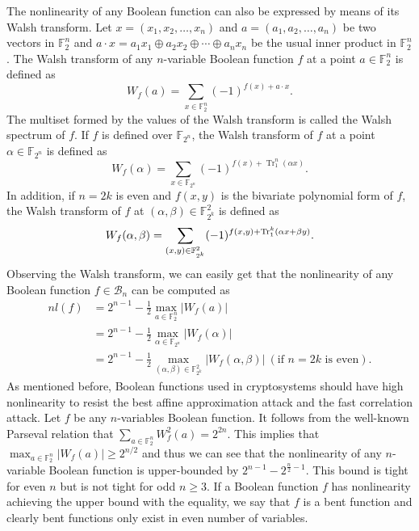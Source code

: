 \documentclass{article}
\newcommand{\F}{\mathbb{F}}
\newcommand{\0}{\textbf{0}}
\newcommand{\1}{\textbf{1}}
\newcommand{\TrN}{\operatorname{Tr}_1^n}
\theoremstyle{plain}
\begin{document}
    The nonlinearity of any Boolean function can also be expressed by means of its Walsh transform.
    Let $x=(x_1,x_2,\dots,x_n)$ and $a=(a_1,a_2,\dots,a_n)$ be two vectors in $\F_2^n$ and $a\cdot x=a_1x_1\oplus a_2x_2\oplus\cdots\oplus a_nx_n$ be the usual inner product in $\F_2^n$.
    The Walsh transform of any $n$-variable Boolean function $f$ at a point $a\in\F_2^n$ is defined as
    \[W_f(a)=\sum_{x\in\F_2^n}(-1)^{f(x)+a\cdot x}.\]
    The multiset formed by the values of the Walsh transform is called the Walsh spectrum of $f$.
    If $f$ is defined over $\F_{2^n}$, the Walsh transform of $f$ at a point $\alpha\in\F_{2^n}$ is defined as
    \[W_f(\alpha)=\sum_{x\in\F_{2^n}}(-1)^{f(x)+\TrN(\alpha x)}.\]
    In addition, if $n=2k$ is even and $f(x,y)$ is the bivariate polynomial form of $f$, the Walsh transform of $f$ at $(\alpha,\beta)\in\F_{2^k}^2$ is defined as
    \[W_f(\alpha,\beta)=\sum_{(x,y)\in\F_{2^k}^2}(-1)^{f(x,y)+\Tr_1^k(\alpha x+\beta y)}.\]
    Observing the Walsh transform, we can easily get that the nonlinearity of any Boolean function $f\in\mathcal{B}_n$ can be computed as
    \begin{align*}
        nl(f) &= 2^{n-1} - \frac{1}{2}\max_{a\in\F_2^n}|W_f(a)|\\
              &= 2^{n-1} - \frac{1}{2}\max_{\alpha\in\F_{2^n}}|W_f(\alpha)|\\
              &= 2^{n-1} - \frac{1}{2}\max_{(\alpha,\beta)\in\F_{2^k}^2}|W_f(\alpha,\beta)|~(\text{if }n=2k\text{ is even}).
    \end{align*}
    As mentioned before, Boolean functions used in cryptosystems should have high nonlinearity to resist the best affine approximation attack and the fast correlation attack.
   Let $f$ be any $n$-variables Boolean function. It follows from the well-known Parseval relation that $\sum_{a\in\F_2^n}W_f^2(a)=2^{2n}$.
   This implies that $\max_{a\in\F_2^n}\left\lvert W_f(a)\right\rvert \geq  2^{n/2}$ and thus we can see that
   the nonlinearity of any $n$-variable Boolean function is upper-bounded by $2^{n-1}-2^{\frac{n}{2}-1}$.
    This bound is tight for even $n$ but is not tight for odd $n\geq 3$.
    If a Boolean function $f$ has nonlinearity achieving the upper bound with the equality,
    we say that $f$ is a bent function and clearly bent functions only exist in even number of variables.
\end{document}

